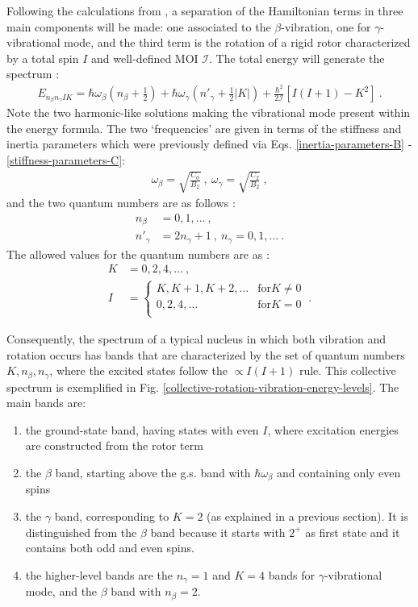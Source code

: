 Following the calculations from \cite{li2022model}, a separation of the Hamiltonian terms in three main components will be made: one associated to the $\beta$-vibration, one for $\gamma$-vibrational mode, and the third term is the rotation of a rigid rotor characterized by a total spin $I$ and well-defined MOI $\mathcal{I}$. The total energy will generate the spectrum \cite{ring2004nuclear,li2022model}:
\begin{align}
    E_{n_\beta n_\gamma IK}=\hbar\omega_\beta\left(n_\beta+\frac{1}{2}\right)+\hbar\omega_\gamma\left(n'_\gamma+\frac{1}{2}|K|\right)+\frac{\hbar^2}{2\mathcal{I}}\left[I(I+1)-K^2\right]\ .
    \label{collective-rotation-vibration-energy-spectrum}
\end{align}
Note the two harmonic-like solutions making the vibrational mode present within the energy formula. The two `frequencies' are given in terms of the stiffness and inertia parameters which were previously defined via Eqs. \ref{inertia-parameters-B} - \ref{stiffness-parameters-C}:
\begin{align}
\omega_\beta=\sqrt{\frac{C_0}{B_2}}\ ,\ \omega_\gamma=\sqrt{\frac{C_2}{B_2}}\ ,   
\end{align}
and the two quantum numbers are as follows \cite{li2022model}: 
\begin{align}
    n_\beta&=0,1,\dots\ ,\\
    n'_\gamma&=2n_\gamma+1\ ,\ n_\gamma=0,1,\dots\ .
\end{align}
The allowed values for the quantum numbers are as \cite{li2022model}:
\begin{align}
    K&=0,2,4,\dots\ ,\nonumber\\
    I&=\begin{cases}
        K,K+1,K+2,\dots &\text{for} K\neq 0\\
        0,2,4,\dots &\text{for} K=0\\
   \end{cases}\ .
\end{align}

Consequently, the spectrum of a typical nucleus in which both vibration and rotation occurs has bands that are characterized by the set of quantum numbers $K,n_\beta,n_\gamma$, where the excited states follow the $\propto I(I+1)$ rule. This collective spectrum is exemplified in Fig. \ref{collective-rotation-vibration-energy-levels}. The main bands are:
\begin{enumerate}
    \item the ground-state band, having states with even $I$, where excitation energies are constructed from the rotor term
    \item the $\beta$ band, starting above the g.s. band with $\hbar\omega_\beta$ and containing only even spins
    \item the $\gamma$ band, corresponding to $K=2$ (as explained in a previous section). It is distinguished from the $\beta$ band because it starts with $2^+$ as first state and it contains both odd and even spins.
    \item the higher-level bands are the $n_\gamma=1$ and $K=4$ bands for $\gamma$-vibrational mode, and the $\beta$ band with $n_\beta=2$.
\end{enumerate}

